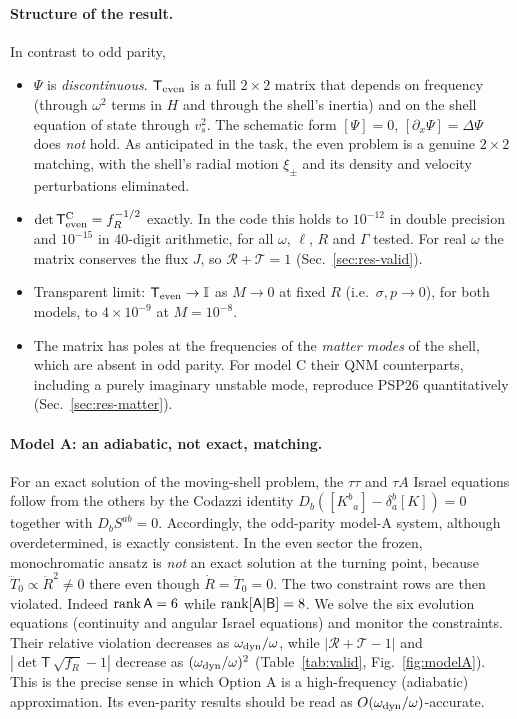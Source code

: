 \documentclass[11pt,a4paper]{article}
\numberwithin{equation}{section}
\newcommand{\sq}{\sqrt{f_R}}
\begin{document}
\paragraph{Structure of the result.} In contrast to odd parity,
\begin{itemize}
\item $\Psi$ is \emph{discontinuous}. $\mathsf T_{\rm even}$ is a full $2\times2$ matrix that depends on
frequency (through $\omega^2$ terms in $H$ and through the shell's inertia) and on the shell equation of state
through $v_s^2$. The schematic form $[\Psi]=0$, $[\partial_x\Psi]=\Delta\Psi$ does \emph{not} hold. As
anticipated in the task, the even problem is a genuine $2\times2$ matching, with the shell's radial motion
$\xi_\pm$ and its density and velocity perturbations eliminated.
\item $\det\mathsf T^{\rm C}_{\rm even}=f_R^{-1/2}$ exactly. In the code this holds to $10^{-12}$ in double
precision and $10^{-15}$ in 40-digit arithmetic, for all $\omega$, $\ell$, $R$ and $\Gamma$ tested. For real
$\omega$ the matrix conserves the flux $J$, so $\mathcal R+\mathcal T=1$ (Sec.~\ref{sec:res-valid}).
\item Transparent limit: $\mathsf T_{\rm even}\to\mathbb{I}$ as $M\to0$ at fixed $R$ (i.e.\ $\sigma,p\to0$), for both
models, to $4\times10^{-9}$ at $M=10^{-8}$.
\item The matrix has poles at the frequencies of the \emph{matter modes} of the shell, which are absent in
odd parity. For model C their QNM counterparts, including a purely imaginary unstable mode, reproduce PSP26
quantitatively (Sec.~\ref{sec:res-matter}).
\end{itemize}

\paragraph{Model A: an adiabatic, not exact, matching.}\label{sec:evenA}
For an exact solution of the moving-shell problem, the $\tau\tau$ and $\tau A$ Israel equations follow from
the others by the Codazzi identity $D_b([K^b{}_a]-\delta^b_a[K])=0$ together with $D_bS^{ab}=0$. Accordingly, the
odd-parity model-A system, although overdetermined, is exactly consistent. In the even sector the frozen,
monochromatic ansatz is \emph{not} an exact solution at the turning point, because
$\dddot T_0\propto\ddot R^2\neq0$ there even though $\dot R=\ddot T_0=0$. The two constraint rows are then
violated. Indeed ${\rm rank}\,\mathsf A=6$ while ${\rm rank}[\mathsf A|\mathsf B]=8$. We solve the six
evolution equations (continuity and angular Israel equations) and monitor the constraints. Their relative
violation decreases as $\omega_{\rm dyn}/\omega$, while $|\mathcal R+\mathcal T-1|$ and $|\det\mathsf T\,\sq-1|$
decrease as $(\omega_{\rm dyn}/\omega)^2$ (Table~\ref{tab:valid}, Fig.~\ref{fig:modelA}). This is the precise
sense in which Option A is a high-frequency (adiabatic) approximation. Its even-parity results should be read
as $O(\omega_{\rm dyn}/\omega)$-accurate.
\end{document}
